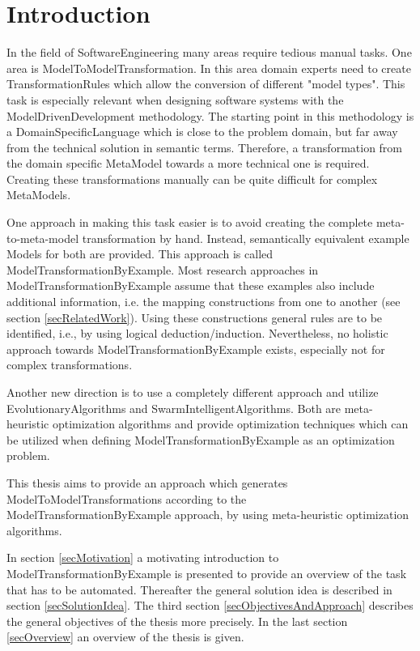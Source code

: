 \chapter{Introduction}\label{chapIntroduction}

In the field of \gls{SoftwareEngineering} many areas require tedious manual tasks. One area is \gls{ModelToModelTransformation}. In this area domain experts need to create \glspl{TransformationRule} which allow the conversion of different "model types". This task is especially relevant when designing software systems with the \gls{ModelDrivenDevelopment} methodology. The starting point in this methodology is a \gls{DomainSpecificLanguage} which is close to the problem domain, but far away from the technical solution in semantic terms. Therefore, a transformation from the domain specific \gls{MetaModel} towards a more technical one is required. Creating these transformations manually can be quite difficult for complex \glspl{MetaModel}. 

One approach in making this task easier is to avoid creating the complete meta-to-meta-model transformation by hand. Instead, semantically equivalent example \glspl{Model} for both are provided. This approach is called \gls{ModelTransformationByExample}. Most research approaches in \gls{ModelTransformationByExample} assume that these examples also include additional information, i.e. the mapping constructions from one to another (see section \ref{secRelatedWork}). Using these constructions general rules are to be identified, i.e., by using logical deduction/induction. Nevertheless, no holistic approach towards \gls{ModelTransformationByExample} exists, especially not for complex transformations. %

Another new direction is to use a completely different approach and utilize \glspl{EvolutionaryAlgorithm} and \glspl{SwarmIntelligentAlgorithm}. Both are meta-heuristic optimization algorithms and provide optimization techniques which can be utilized when defining \gls{ModelTransformationByExample} as an optimization problem. 

This thesis aims to provide an approach which generates \glspl{ModelToModelTransformation} according to the \gls{ModelTransformationByExample} approach, by using meta-heuristic optimization algorithms.

In section \ref{secMotivation} a motivating introduction to \gls{ModelTransformationByExample} is presented to provide an overview of the task that has to be automated. Thereafter the general solution idea is described in section \ref{secSolutionIdea}. The third section \ref{secObjectivesAndApproach} describes the general objectives of the thesis more precisely. In the last section \ref{secOverview} an overview of the thesis is given.

